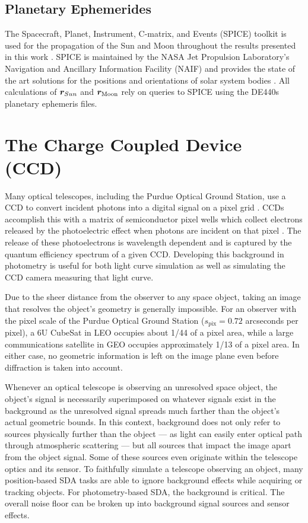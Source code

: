 \subsection{Planetary Ephemerides} \label{sec:planet_ephem}

The Spacecraft, Planet, Instrument, C-matrix, and Events (SPICE) toolkit is used for the propagation of the Sun and Moon throughout the results presented in this work \cite{spice}. SPICE is maintained by the NASA Jet Propulsion Laboratory's Navigation and Ancillary Information Facility (NAIF) and provides the state of the art solutions for the positions and orientations of solar system bodies \cite{spice}. All calculations of $\bm{r}_{Sun}$ and $\bm{r}_\mathrm{Moon}$ rely on queries to SPICE using the DE440s planetary ephemeris files.

\section{The Charge Coupled Device (CCD)} \label{sec:ccd_performance}

Many optical telescopes, including the Purdue Optical Ground Station, use a CCD to convert incident photons into a digital signal on a pixel grid \cite{krag2003}. CCDs accomplish this with a matrix of semiconductor pixel wells which collect electrons released by the photoelectric effect when photons are incident on that pixel \cite{krag2003}. The release of these photoelectrons is wavelength dependent and is captured by the quantum efficiency spectrum of a given CCD. Developing this background in photometry is useful for both light curve simulation as well as simulating the CCD camera measuring that light curve. 

Due to the sheer distance from the observer to any space object, taking an image that resolves the object's geometry is generally impossible. For an observer with the pixel scale of the Purdue Optical Ground Station ($s_\mathrm{pix} = 0.72$ arcseconds per pixel), a 6U CubeSat in LEO occupies about 1/44 of a pixel area, while a large communications satellite in GEO occupies approximately 1/13 of a pixel area. In either case, no geometric information is left on the image plane even before diffraction is taken into account. 

Whenever an optical telescope is observing an unresolved space object, the object's signal is necessarily superimposed on whatever signals exist in the background as the unresolved signal spreads much farther than the object's actual geometric bounds. In this context, background does not only refer to sources physically further than the object --- as light can easily enter optical path through atmospheric scattering --- but all sources that impact the image apart from the object signal. Some of these sources even originate within the telescope optics and its sensor. To faithfully simulate a telescope observing an object, many position-based SDA tasks are able to ignore background effects while acquiring or tracking objects. For photometry-based SDA, the background is critical. The overall noise floor can be broken up into background signal sources and sensor effects.

